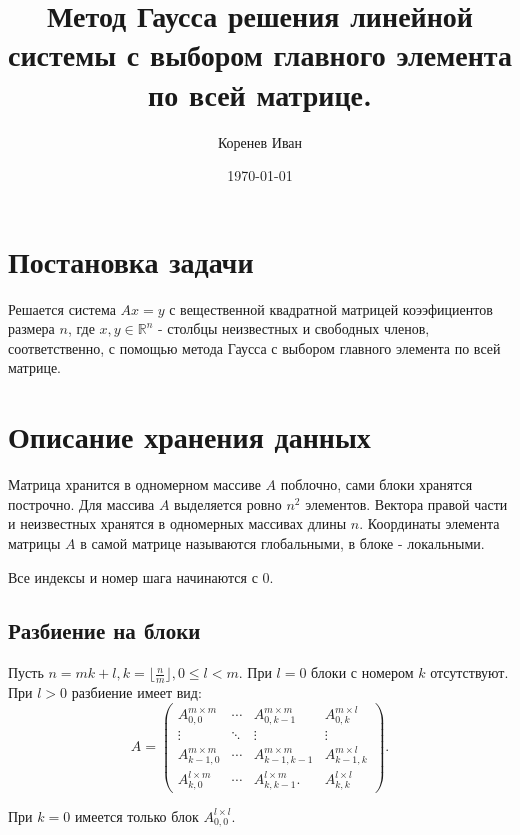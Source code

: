 \documentclass[a4paper,12pt]{article}
\begin{document}
\author{Коренев Иван}
\title{Метод Гаусса решения линейной системы с выбором главного элемента по всей матрице.}
\date{\today}
\maketitle



\section{Постановка задачи}
Решается система $Ax = y$ с вещественной квадратной матрицей коээфициентов размера $n$, где $x, y \in \mathbb{R}^n$ - столбцы неизвестных и свободных членов, соответственно, с помощью метода Гаусса с выбором главного элемента по всей матрице.

\section{Описание хранения данных}
Матрица хранится в одномерном массиве $A$ поблочно, сами блоки хранятся построчно. Для массива $A$ выделяется ровно $n^2$ элементов. Вектора правой части и неизвестных хранятся в одномерных массивах длины $n$. Координаты элемента матрицы $A$ в самой матрице называются глобальными, в блоке - локальными.

Все индексы и номер шага начинаются с $0$.
\subsection{Разбиение на блоки}
Пусть $n = m k + l, k = \lfloor \frac{n}{m} \rfloor, 0 \leq l < m$. При $l = 0$ блоки с номером $k$ отсутствуют. При $l > 0$ разбиение имеет вид:
\[
    A =
    \begin{pmatrix}
        A_{0, 0}^{m \times m} & \cdots & A_{0, k - 1}^{m \times m} & A_{0, k}^{m \times l}     \\
        \vdots & \ddots & \vdots & \vdots                    \\
        A_{k - 1, 0}^{m \times m} & \cdots & A_{k - 1, k - 1}^{m \times m} & A_{k - 1, k}^{m \times l} \\
        A_{k, 0}^{l \times m} & \cdots & A_{k, k - 1}^{l \times m}. & A_{k, k}^{l \times l}
    \end{pmatrix}.
\]

При $k = 0$ имеется только блок $A_{0, 0}^{l \times l}$.
\end{document}
